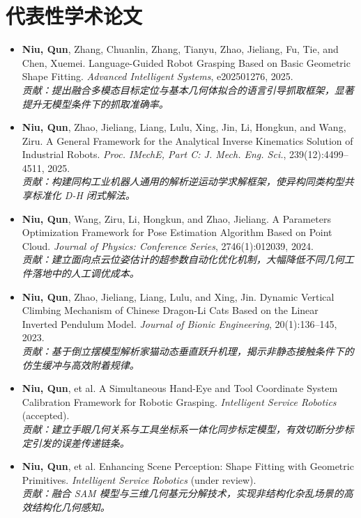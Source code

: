 \documentclass[10.5pt,a4paper]{article}
\begin{document}
\section*{代表性学术论文}
\begin{itemize}
	\item \textbf{Niu, Qun}, Zhang, Chuanlin, Zhang, Tianyu, Zhao, Jieliang, Fu, Tie, and Chen, Xuemei. Language-Guided Robot Grasping Based on Basic Geometric Shape Fitting. \textit{Advanced Intelligent Systems}, e202501276, 2025.\\
	\textit{\small 贡献：提出融合多模态目标定位与基本几何体拟合的语言引导抓取框架，显著提升无模型条件下的抓取准确率。}
	\item \textbf{Niu, Qun}, Zhao, Jieliang, Liang, Lulu, Xing, Jin, Li, Hongkun, and Wang, Ziru. A General Framework for the Analytical Inverse Kinematics Solution of Industrial Robots. \textit{Proc. IMechE, Part C: J. Mech. Eng. Sci.}, 239(12):4499--4511, 2025.\\
	\textit{\small 贡献：构建同构工业机器人通用的解析逆运动学求解框架，使异构同类构型共享标准化 D-H 闭式解法。}
	\item \textbf{Niu, Qun}, Wang, Ziru, Li, Hongkun, and Zhao, Jieliang. A Parameters Optimization Framework for Pose Estimation Algorithm Based on Point Cloud. \textit{Journal of Physics: Conference Series}, 2746(1):012039, 2024.\\
	\textit{\small 贡献：建立面向点云位姿估计的超参数自动化优化机制，大幅降低不同几何工件落地中的人工调优成本。}
	\item \textbf{Niu, Qun}, Zhao, Jieliang, Liang, Lulu, and Xing, Jin. Dynamic Vertical Climbing Mechanism of Chinese Dragon-Li Cats Based on the Linear Inverted Pendulum Model. \textit{Journal of Bionic Engineering}, 20(1):136--145, 2023.\\
	\textit{\small 贡献：基于倒立摆模型解析家猫动态垂直跃升机理，揭示非静态接触条件下的仿生缓冲与高效附着规律。}
	\item \textbf{Niu, Qun}, et al. A Simultaneous Hand-Eye and Tool Coordinate System Calibration Framework for Robotic Grasping. \textit{Intelligent Service Robotics} (accepted).\\
	\textit{\small 贡献：建立手眼几何关系与工具坐标系一体化同步标定模型，有效切断分步标定引发的误差传递链条。}
	\item \textbf{Niu, Qun}, et al. Enhancing Scene Perception: Shape Fitting with Geometric Primitives. \textit{Intelligent Service Robotics} (under review).\\
	\textit{\small 贡献：融合 SAM 模型与三维几何基元分解技术，实现非结构化杂乱场景的高效结构化几何感知。}
\end{itemize}
\end{document}
